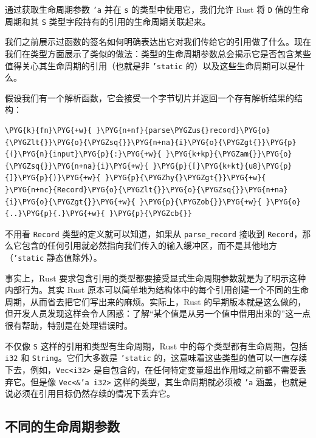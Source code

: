 通过获取生命周期参数 \texttt{'a} 并在 \texttt{s} 的类型中使用它，我们允许 Rust 将 \texttt{D} 值的生命周期和其 \texttt{S} 类型字段持有的引用的生命周期关联起来。

我们之前展示过函数的签名如何明确表达出它对我们传给它的引用做了什么。现在我们在类型方面展示了类似的做法：类型的生命周期参数总会揭示它是否包含某些值得关心其生命周期的引用（也就是非 \texttt{'static} 的）以及这些生命周期可以是什么。

假设我们有一个解析函数，它会接受一个字节切片并返回一个存有解析结果的结构：

\begin{Verbatim}[commandchars=\\\{\},breaklines=true,breakanywhere=true,fontsize=\codefont,xleftmargin=17bp]
\PYG{k}{fn}\PYG{+w}{ }\PYG{n+nf}{parse\PYGZus{}record}\PYG{o}{\PYGZlt{}}\PYG{o}{\PYGZsq{}}\PYG{n+na}{i}\PYG{o}{\PYGZgt{}}\PYG{p}{(}\PYG{n}{input}\PYG{p}{:}\PYG{+w}{ }\PYG{k+kp}{\PYGZam{}}\PYG{o}{\PYGZsq{}}\PYG{n+na}{i}\PYG{+w}{ }\PYG{p}{[}\PYG{k+kt}{u8}\PYG{p}{]}\PYG{p}{)}\PYG{+w}{ }\PYG{p}{\PYGZhy{}\PYGZgt{}}\PYG{+w}{ }\PYG{n+nc}{Record}\PYG{o}{\PYGZlt{}}\PYG{o}{\PYGZsq{}}\PYG{n+na}{i}\PYG{o}{\PYGZgt{}}\PYG{+w}{ }\PYG{p}{\PYGZob{}}\PYG{+w}{ }\PYG{o}{..}\PYG{p}{.}\PYG{+w}{ }\PYG{p}{\PYGZcb{}}
\end{Verbatim}

不用看 \texttt{Record} 类型的定义就可以知道，如果从 \texttt{parse\_record} 接收到 \texttt{Record}，那么它包含的任何引用就必然指向我们传入的输入缓冲区，而不是其他地方（\texttt{'static} 静态值除外）。

事实上，Rust 要求包含引用的类型都要接受显式生命周期参数就是为了明示这种内部行为。其实 Rust 原本可以简单地为结构体中的每个引用创建一个不同的生命周期，从而省去把它们写出来的麻烦。实际上，Rust 的早期版本就是这么做的，但开发人员发现这样会令人困惑：了解“某个值是从另一个值中借用出来的”这一点很有帮助，特别是在处理错误时。

不仅像 \texttt{S} 这样的引用和类型有生命周期，Rust 中的每个类型都有生命周期，包括 \texttt{i32} 和 \texttt{String}。它们大多数是 \texttt{'static} 的，这意味着这些类型的值可以一直存续下去，例如，\texttt{Vec<i32>} 是自包含的，在任何特定变量超出作用域之前都不需要丢弃它。但是像 \texttt{Vec<\&'a i32>} 这样的类型，其生命周期就必须被 \texttt{'a} 涵盖，也就是说必须在引用目标仍然存续的情况下丢弃它。

\subsection{不同的生命周期参数}

